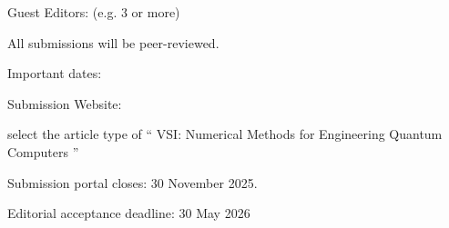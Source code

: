 \documentclass[]{article}
\begin{document}
Guest Editors: (e.g. 3 or more)
\par\noindent

All submissions will be peer-reviewed.
\par\noindent

Important dates:
\par\noindent

Submission Website: 
\par\noindent
select the article type of `` VSI: Numerical Methods for Engineering Quantum Computers '' 
\par\noindent

Submission portal closes: 30 November 2025.
\par\noindent

Editorial acceptance deadline: 30 May 2026
\par\noindent



\end{document}
